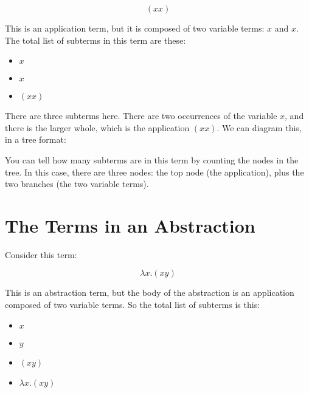 \documentclass{book}
\numberwithin{equation}{chapter}
\begin{document}
\begin{equation}
(xx)
\end{equation}

\noindent
This is an application term, but it is composed of two variable terms: $x$ and $x$. The total list of subterms in this term are these:

\begin{itemize}
\item{$x$}
\item{$x$}
\item{$(xx)$}
\end{itemize}

\noindent
There are three subterms here. There are two occurrences of the variable $x$, and there is the larger whole, which is the application $(xx)$. We can diagram this, in a tree format:

\begin{center}
\end{center}

\noindent
You can tell how many subterms are in this term by counting the nodes in the tree. In this case, there are three nodes: the top node (the application), plus the two branches (the two variable terms).


\section{The Terms in an Abstraction}

Consider this term:

\begin{equation}
\lambda x.(xy)
\end{equation}

\noindent
This is an abstraction term, but the body of the abstraction is an application composed of two variable terms. So the total list of subterms is this:

\begin{itemize}
\item{$x$}
\item{$y$}
\item{$(xy)$}
\item{$\lambda x.(xy)$}
\end{itemize}
\end{document}

